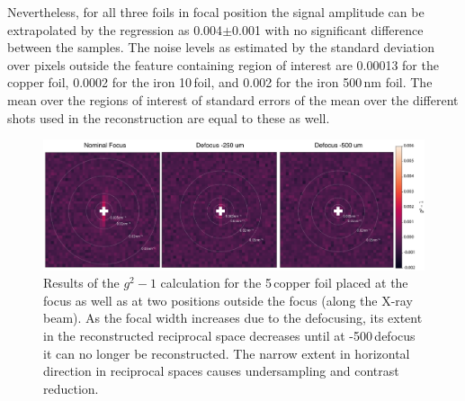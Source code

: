 Nevertheless, for all three foils in focal position the signal amplitude can be extrapolated by the regression as 0.004$\pm$0.001 with no significant difference between the samples.
The noise levels as estimated by the standard deviation over pixels outside the feature containing region of interest are  0.00013 for the copper foil, 0.0002 for the iron 10\,\micrometer foil, and 0.002 for the iron 500\,nm foil. The mean over the regions of interest of standard errors of the mean over the different shots used in the reconstruction are equal to these as well.

\begin{figure}
	\centering
	\includegraphics[width=0.9\linewidth]{images/Cu5um_reco2d.pdf}
	\caption[Results copper foil]{Results of the $g^2-1$ calculation for the 5\,\micrometer copper foil placed at the focus as well as at two positions outside the focus (along the X-ray beam). As the focal width increases due to the defocusing, its extent in the reconstructed reciprocal space decreases until at -500\,\micrometer defocus it can no longer be reconstructed. The narrow extent in horizontal direction in reciprocal spaces causes undersampling and contrast reduction. }
	\label{fig:Cu5umreco2d}
\end{figure}
